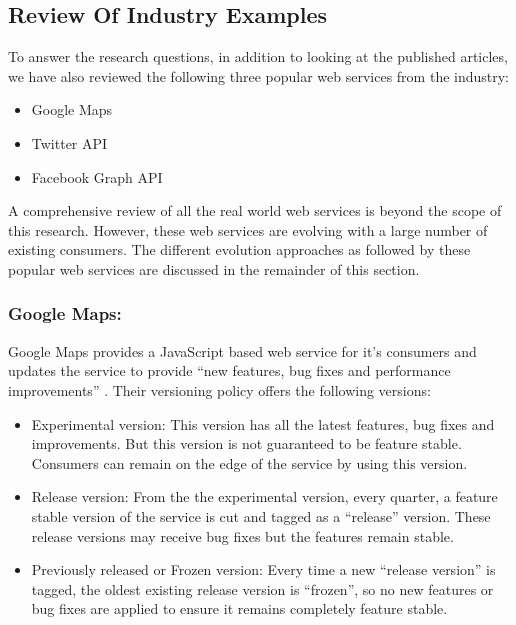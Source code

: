 \documentclass[runningheads,a4paper]{llncs}
\begin{document}


\subsection{Review Of Industry Examples} %
\label{sub:review_of_industry_examples}

To answer the research questions, in addition to looking at the published articles, we have also reviewed the following three popular web services from the industry:

\begin{itemize}
  \item Google Maps
  \item Twitter API
  \item Facebook Graph API
\end{itemize}

A comprehensive review of all the real world web services is beyond the scope of this research. However, these web services are evolving with a large number of existing consumers. The different evolution approaches as followed by these popular web services are discussed in the remainder of this section.

\subsubsection{Google Maps:}
Google Maps provides a JavaScript based web service for it’s consumers and updates the service to provide ``new features, bug fixes and performance improvements'' \cite{google_maps_versioning}. Their versioning policy offers the following versions:

\begin{itemize}
  \item Experimental version: This version has all the latest features, bug fixes and improvements. But this version is not guaranteed to be feature stable. Consumers can remain on the edge of the service by using this version.
  \item Release version: From the the experimental version, every quarter, a feature stable version of the service is cut and tagged as a ``release'' version. These release versions may receive bug fixes but the features remain stable.
  \item Previously released or Frozen version: Every time a new ``release version'' is tagged, the oldest existing release version is ``frozen'', so no new features or bug fixes are applied to ensure it remains completely feature stable.
\end{itemize}
\end{document}
